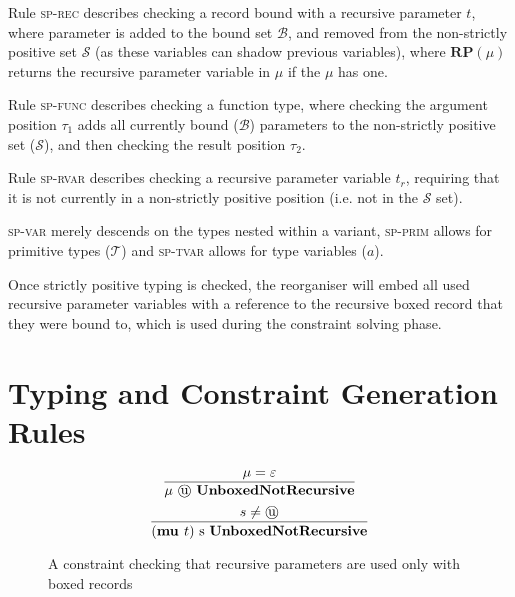 Rule \textsc{sp-rec} describes checking a record bound with a recursive parameter $t$, where parameter 
is added to the bound set $\mathcal{B}$, and removed from the non-strictly positive set $\mathcal{S}$
(as these variables can shadow previous variables), where $\textbf{RP}(\mu)$ returns the recursive
parameter variable in $\mu$ if the $\mu$ has one.

Rule \textsc{sp-func} describes checking a function type, where checking the argument position $\tau_1$ adds
all currently bound ($\mathcal{B}$) parameters to the non-strictly positive set ($\mathcal{S}$), and then
checking the result position $\tau_2$.

Rule \textsc{sp-rvar} describes checking a recursive parameter variable $t_r$, requiring that it is not currently
in a non-strictly positive position (i.e. not in the $\mathcal{S}$ set). 

\textsc{sp-var} merely descends on the types nested within a variant,
\textsc{sp-prim} allows for primitive types ($\mathcal{T}$) and
\textsc{sp-tvar} allows for type variables ($a$).

Once strictly positive typing is checked, the reorganiser will embed all used recursive parameter variables
with a reference to the recursive boxed record that they were bound to, which is used during the constraint
solving phase.

\section{Typing and Constraint Generation Rules}

\begin{figure}
    \centering
    $$
        \infer{
            \mu \text{ \textcircled{u} } \textbf{UnboxedNotRecursive}
        }{
            \mu = \varepsilon
        }
    $$
    $$
        \infer{
            (\textbf{mu } t) \text{ s } \textbf{UnboxedNotRecursive}
        }{
            s \neq \text{\textcircled{u}}
        }
    $$
    \caption{A constraint checking that recursive parameters are used only with boxed records}
    \label{fig:unboxednotrecursive}
\end{figure}

